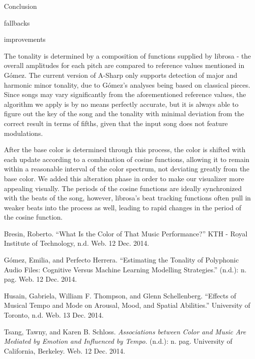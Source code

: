 \documentclass{article}
\begin{document}
Conclusion

fallbacks

improvements

The tonality is determined by a composition of functions supplied by librosa - the overall amplitudes for each pitch are compared to reference values mentioned in Gómez. The current version of A-Sharp only supports detection of major and harmonic minor tonality, due to Gómez's analyses being based on classical pieces. Since songs may vary significantly from the aforementioned reference values, the algorithm we apply is by no means perfectly accurate, but it is always able to figure out the key of the song and the tonality with minimal deviation from the correct result in terms of fifths, given that the input song does not feature modulations.

After the base color is determined through this process, the color is shifted with each update according to a combination of cosine functions, allowing it to remain within a reasonable interval of the color spectrum, not deviating greatly from the base color. We added this alteration phase in order to make our visualizer more appealing visually. The periods of the cosine functions are ideally synchronized with the beats of the song, however, librosa's beat tracking functions often pull in weaker beats into the process as well, leading to rapid changes in the period of the cosine function.

\begin{thebibliography}{9}

    Bresin, Roberto.
    ``What Is the Color of That Music Performance?''
    KTH - Royal Institute of Technology, n.d. Web. 12 Dec. 2014.

    G\'{o}mez, Emilia, and Perfecto Herrera.
    ``Estimating the Tonality of Polyphonic Audio Files: Cognitive Versus Machine Learning Modelling Strategies.''
    (n.d.): n. pag. Web. 12 Dec. 2014.

    Husain, Gabriela, William F. Thompson, and Glenn Schellenberg.
    ``Effects of Musical Tempo and Mode on Arousal, Mood, and Spatial Abilities.''
    University of Toronto, n.d. Web. 13 Dec. 2014.

    Tsang, Tawny, and Karen B. Schloss.
    \emph{Associations between Color and Music Are Mediated by Emotion and Influenced by Tempo.}
    (n.d.): n. pag.
    University of California, Berkeley. Web. 12 Dec. 2014.

\end{thebibliography}
\end{document}
